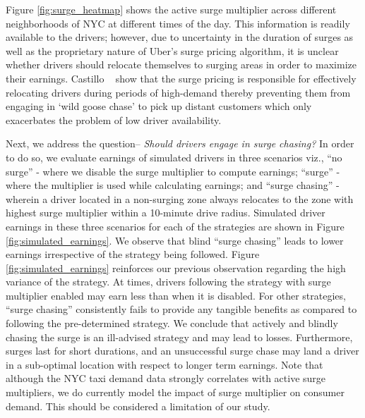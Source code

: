 Figure \ref{fig:surge_heatmap} shows the active surge multiplier across different neighborhoods of NYC at 
different times of the day. 
This information is readily available to the drivers; however, due to uncertainty in the duration of surges 
  as well as the proprietary nature of Uber's surge pricing algorithm, 
  it is unclear whether drivers should relocate themselves to surging areas in order to maximize their earnings.
Castillo {\etal}~\cite{castillo2017surge} show that the surge pricing is responsible for effectively relocating drivers during periods of high-demand thereby preventing them from engaging in `wild goose chase' to pick up distant customers which only exacerbates the problem of low driver availability.


Next, we address the question-- \textit{Should drivers engage in surge chasing?}
In order to do so, we evaluate earnings of simulated drivers in three scenarios viz., 
``no surge'' - where we disable the surge multiplier to compute earnings; ``surge'' - 
where the multiplier is used while calculating earnings; and ``surge chasing'' -
wherein a driver located in a non-surging zone always relocates to the zone with highest surge multiplier within a 10-minute drive radius. 
Simulated driver earnings in these three scenarios for each of the strategies are shown in Figure {\ref{fig:simulated_earnings}}. 
We observe that blind ``surge chasing'' leads to lower earnings irrespective of the strategy being followed. 
Figure \ref{fig:simulated_earnings} reinforces our previous observation regarding the high variance of the {\naive} strategy. 
At times, drivers following the {\naive} strategy with surge multiplier enabled may earn less than when it is disabled. 
For other strategies, ``surge chasing'' consistently fails to provide any tangible benefits as compared to 
following the pre-determined strategy. We conclude that actively and blindly chasing the surge is an ill-advised 
strategy and may lead to losses. Furthermore, surges last for short durations, and an unsuccessful surge chase 
may land a driver in a sub-optimal location with respect to longer term earnings. 
Note that although the NYC taxi demand data strongly 
correlates with active surge multipliers, we do 
currently model the impact of surge multiplier on consumer demand. This should be considered a limitation of our study.

